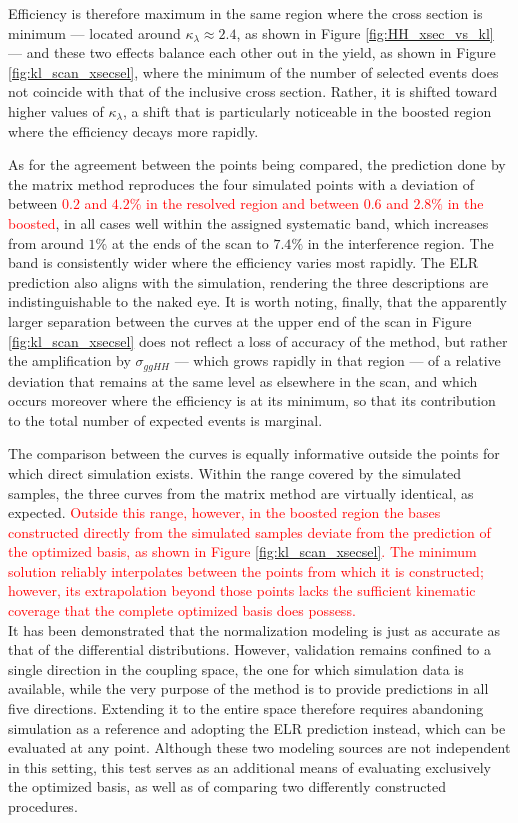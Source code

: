 Efficiency is therefore maximum in the same region where the cross section is minimum — located around $\kappa_\lambda\approx2.4$, as shown in Figure \ref{fig:HH_xsec_vs_kl} — and these two effects balance each other out in the yield, as shown in Figure \ref{fig:kl_scan_xsecsel}, where the minimum of the number of selected events does not coincide with that of the inclusive cross section. Rather, it is shifted toward higher values of $\kappa_\lambda$, a shift that is particularly noticeable in the boosted region where the efficiency decays more rapidly.

As for the agreement between the points being compared, the prediction done by the matrix method reproduces the four simulated points with a deviation of between \textcolor{red}{$0.2$ and $4.2\%$ in the resolved region and between $0.6$ and $2.8\%$ in the boosted}, in all cases well within the assigned systematic band, which increases from around $1\%$ at the ends of the scan to $7.4\%$ in the interference region. The band is consistently wider where the efficiency varies most rapidly. The ELR prediction also aligns with the simulation, rendering the three descriptions are indistinguishable to the naked eye. It is worth noting, finally, that the apparently larger separation between the curves at the upper end of the scan in Figure \ref{fig:kl_scan_xsecsel} does not reflect a loss of accuracy of the method, but rather the amplification by $\sigma_{ggHH}$ — which grows rapidly in that region — of a relative deviation that remains at the same level as elsewhere in the scan, and which occurs moreover where the efficiency is at its minimum, so that its contribution to the total number of expected events is marginal.

The comparison between the curves is equally informative outside the points for which direct simulation exists. Within the range covered by the simulated samples, the three curves from the matrix method are virtually identical, as expected. \textcolor{red}{Outside this range, however, in the boosted region the bases constructed directly from the simulated samples deviate from the prediction of the optimized basis, as shown in Figure \ref{fig:kl_scan_xsecsel}. The minimum solution reliably interpolates between the points from which it is constructed; however, its extrapolation beyond those points lacks the sufficient kinematic coverage that the complete optimized basis does possess.}\\

It has been demonstrated that the normalization modeling is just as accurate as that of the differential distributions. However, validation remains confined to a single direction in the coupling space, the one for which simulation data is available, while the very purpose of the method is to provide predictions in all five directions. Extending it to the entire space therefore requires abandoning simulation as a reference and adopting the ELR prediction instead, which can be evaluated at any point. Although these two modeling sources are not independent in this setting, this test serves as an additional means of evaluating exclusively the optimized basis, as well as of comparing two differently constructed procedures.

